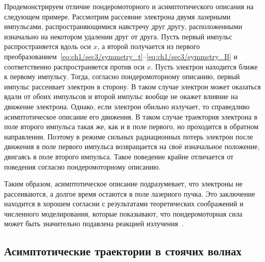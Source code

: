 Продемонстрируем отличие пондеромоторного и асимптотического описания на следующем примере. Рассмотрим рассеяние электрона двумя лазерными импульсами, распространяющимися навстречу друг другу, расположенными изначально на некотором удалении друг от друга. Пусть первый импульс распространяется вдоль оси $x$, а второй получается из первого преобразованием~\eqref{eq:ch1/sec3/symmetry_t}--\eqref{eq:ch1/sec3/symmetry_B} и соответственно распространяется против оси $x$. Пусть электрон находится ближе к первому импульсу. Тогда, согласно пондеромоторному описанию, первый импульс рассеивает электрон в сторону. В таком случае электрон может оказаться вдали от обоих импульсов и второй импульс вообще не окажет влияние на движение электрона. Однако, если электрон обильно излучает, то справедливо асимптотическое описание его движения. В таком случае траектория электрона в поле второго импульса такая же, как и в поле первого, но проходится в обратном направлении. Поэтому в режиме сильных радиационных потерь электрон после движения в поле первого импульса возвращается на своё изначальное положение, двигаясь в поле второго импульса. Такое поведение крайне отличается от поведения согласно пондеромоторному описанию.

Таким образом, асимптотическое описание подразумевает, что электроны не рассеиваются, а долгое время остаются в поле лазерного пучка. Это заключение находится в хорошем согласии с результатами теоретических соображений и численного моделирования, которые показывают, что пондеромоторная сила может быть значительно подавлена реакцией излучения~\cite{Fedotov14b, Ji14b}.

\subsection{Асимптотические траектории в стоячих волнах}
\label{sub:ch1/sec3/standing-waves}

